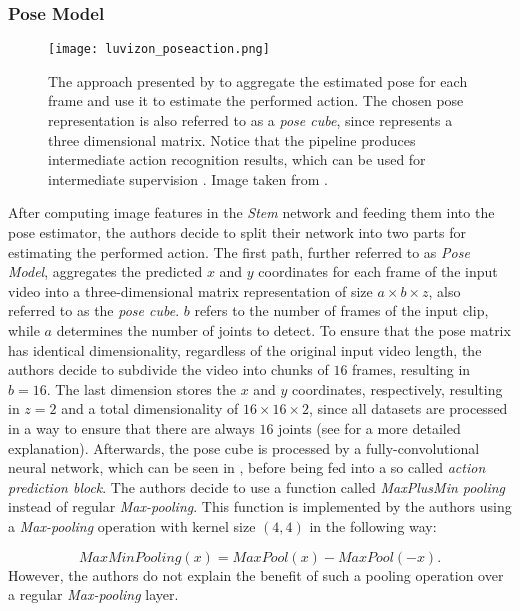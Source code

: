 \subsubsection{Pose Model}
\label{sec:pose_based_action_recognition}
\begin{figure}[htb!]
    \centering
    \texttt{[image: luvizon\_poseaction.png]}
    \caption{The approach presented by \cite{luvizon_2d/3d_2018} to aggregate the estimated pose for each frame and use it to estimate the performed action. The chosen pose representation is also referred to as a \textit{pose cube}, since represents a three dimensional matrix. Notice that the pipeline produces intermediate action recognition results, which can be used for intermediate supervision . Image taken from \cite{luvizon_2d/3d_2018}.}
    \label{fig:luvizon_poseaction}
\end{figure}

After computing image features in the \textit{Stem} network and feeding them into the pose estimator, the authors decide to split their network into two parts for estimating the performed action.
The first path, further referred to as \textit{Pose Model}, aggregates the predicted $x$ and $y$ coordinates for each frame of the input video into a three-dimensional matrix representation of size $a \times b \times z$, also referred to as the \textit{pose cube}.
$b$ refers to the number of frames of the input clip, while $a$ determines the number of joints to detect.
To ensure that the pose matrix has identical dimensionality, regardless of the original input video length, the authors decide to subdivide the video into chunks of $16$ frames, resulting in $b=16$.
The last dimension stores the $x$ and $y$ coordinates, respectively, resulting in $z=2$ and a total dimensionality of $16 \times 16 \times 2$, since all datasets are processed in a way to ensure that there are always $16$ joints (see  for a more detailed explanation).
Afterwards, the pose cube is processed by a fully-convolutional neural network, which can be seen in , before being fed into a so called \textit{action prediction block}.
The authors decide to use a function called \textit{MaxPlusMin pooling} instead of regular \textit{Max-pooling}.
This function is implemented by the authors using a \textit{Max-pooling} operation with kernel size $(4,4)$ in the following way:

\begin{equation}
    MaxMinPooling(x) = MaxPool(x) - MaxPool(-x).
\end{equation}
However, the authors do not explain the benefit of such a pooling operation over a regular \textit{Max-pooling} layer.

